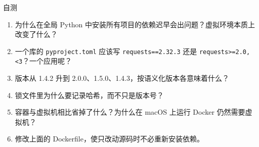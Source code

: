 \documentclass[a4paper]{article}
\begin{document}
\begin{practicebox}{自测}
\begin{enumerate}
\item 为什么在全局 Python 中安装所有项目的依赖迟早会出问题？虚拟环境本质上改变了什么？
\item 一个库的 \texttt{pyproject.toml} 应该写 \texttt{requests==2.32.3} 还是 \texttt{requests>=2.0,<3}？一个应用呢？
\item 版本从 1.4.2 升到 2.0.0、1.5.0、1.4.3，按语义化版本各意味着什么？
\item 锁文件里为什么要记录哈希，而不只是版本号？
\item 容器与虚拟机相比省掉了什么？为什么在 macOS 上运行 Docker 仍然需要虚拟机？
\item 修改上面的 Dockerfile，使只改动源码时不必重新安装依赖。
\end{enumerate}
\end{practicebox}
\end{document}
